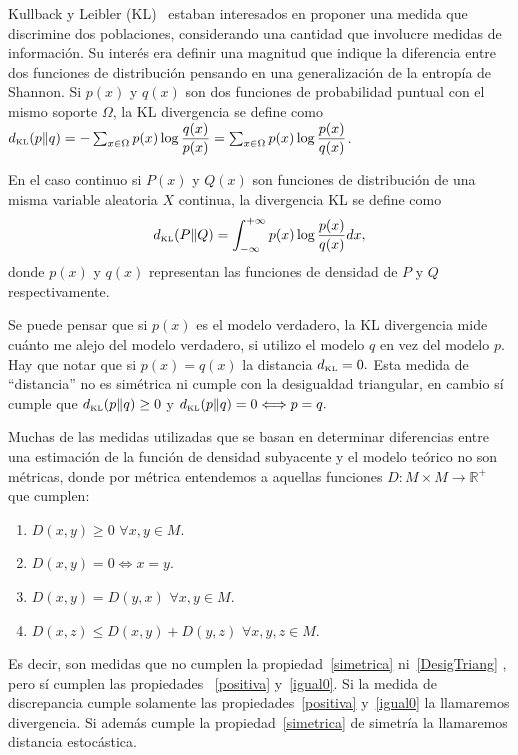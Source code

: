 Kullback y Leibler (KL)~\cite{KullbackLeibler1951} estaban interesados en proponer una medida que discrimine dos poblaciones, considerando una cantidad que involucre medidas de informaci\'on. Su inter\'es era definir una magnitud que indique la diferencia entre dos funciones de distribuci\'on pensando en una generalizaci\'on de la entrop\'ia de Shannon. Si $p(x)$ y $q(x)$ son dos funciones de probabilidad puntual con el mismo soporte $\Omega$, la KL divergencia se define como $d_{\text{\tiny{KL}}}(p \rVert q)=-\sum_{x \in \Omega} p(x) \log \dfrac{q(x)}{p(x)}=\sum_{x \in \Omega} p(x) \log\dfrac{p(x)}{q(x)}$. 

En el caso continuo si $P(x)$ y $Q(x)$ son funciones de distribuci\'on de una misma variable aleatoria $X$ continua, la divergencia KL se define como 
\begin{align}
\label{KL}
d_{\text{\tiny{KL}}}(P \rVert Q)=\int_{-\infty}^{+\infty} p(x) \log\dfrac{p(x)}{q(x)} dx,
\end{align} 
donde $p(x)$ y $q(x)$ representan las funciones de densidad de $P$ y $Q$ respectivamente. 

Se puede pensar que si $p(x)$ es el modelo verdadero, la KL divergencia mide cu\'anto me alejo del modelo verdadero, si utilizo el modelo $q$ en vez del modelo $p$. Hay que notar que si $p(x)=q(x)$ la distancia $d_\text{\tiny{KL}}=0.$ Esta medida de ``distancia'' no es sim\'etrica ni cumple con la desigualdad triangular,  en cambio s\'i cumple que $d_{\text{\tiny{KL}}}(p \rVert q)\geq 0$ y $d_{\text{\tiny{KL}}}(p \rVert q)= 0 \Longleftrightarrow p=q.$ 

Muchas de las medidas utilizadas que se basan en determinar diferencias entre una estimación de la función de densidad subyacente y el modelo teórico no son métricas, donde por métrica entendemos a aquellas funciones $D:M \times M\rightarrow \mathbb{R}^+$ que cumplen:

\begin{enumerate}
	\label{metrica}
	\item \label{positiva}$D(x,y)\geq 0$ $\forall x,y \in M$.
	\item \label{igual0}$D(x,y)= 0 \Leftrightarrow x=y$.
	\item \label{simetrica}$D(x,y)=D(y,x)$  $\forall x,y \in M$.
	\item \label{DesigTriang}$D(x,z)\leq D(x,y)+D(y,z)$  $\forall x,y,z \in M$.
\end{enumerate} 

Es decir, son medidas que no cumplen la propiedad~\ref{simetrica} ni~\ref{DesigTriang} , pero sí cumplen las propiedades ~\ref{positiva} y~\ref{igual0}. Si la medida de discrepancia cumple solamente las propiedades~\ref{positiva} y~\ref{igual0} la llamaremos divergencia. Si además cumple la propiedad~\ref{simetrica} de simetría la llamaremos distancia estocástica. 

